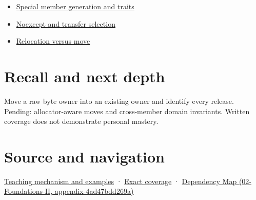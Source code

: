 \begin{itemize}
\tightlist
\item
  \hyperref[appendix-42e02a12c694]{Special member generation and traits}
\item
  \hyperref[appendix-c746afaa47d1]{Noexcept and transfer selection}
\item
  \hyperref[appendix-adfd6397af8d]{Relocation versus move}
\end{itemize}

\section{Recall and next depth}\label{appendix-5636651017c2-recall-and-next-depth}

Move a raw byte owner into an existing owner and identify every release. Pending: allocator-aware moves and cross-member domain invariants. Written coverage does not demonstrate personal mastery.

\section{Source and navigation}\label{appendix-5636651017c2-source-and-navigation}

\href{Continuous\%20Notes/Computing\%20Foundations\%20-\%20From\%20Bits\%20to\%20C++\%20and\%20Systems\%20APIs\#A\%20move\%20transfers\%20responsibility\%20while\%20the\%20source\%20survives}{Teaching mechanism and examples} · \hyperref[appendix-fd090d982a15-m009---parts-127-147]{Exact coverage} · \href{../02-Foundations-II/main.pdf\#nameddest=appendix-4ad47bdd269a}{Dependency Map (02-Foundations-II, appendix-4ad47bdd269a)}
